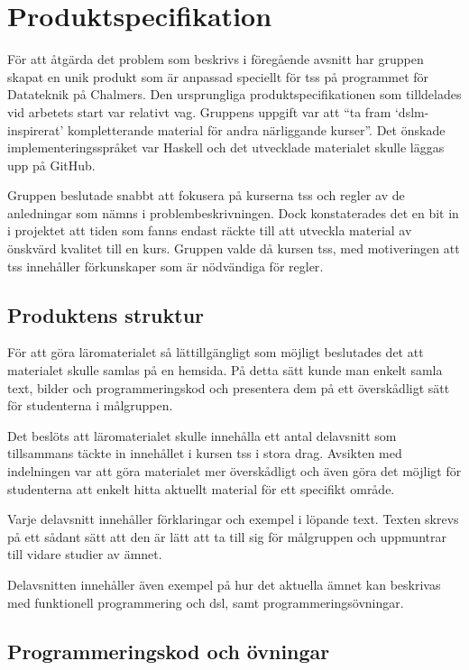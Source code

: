 \documentclass[12pt,a4paper,twoside,openright]{article}
\begin{document}
\newpage

\section{Produktspecifikation}
För att åtgärda det problem som beskrivs i föregående avsnitt har
gruppen skapat en unik produkt som är anpassad speciellt för \gls{tss}
på programmet för Datateknik på Chalmers. Den ursprungliga
produktspecifikationen som tilldelades vid arbetets start var relativt
vag. Gruppens uppgift var att ``ta fram `\gls{dslm}-inspirerat'
kompletterande material för andra närliggande kurser''. Det önskade
implementerings\-språket var Haskell och det utvecklade materialet
skulle läggas upp på GitHub.

Gruppen beslutade snabbt att fokusera på kurserna \gls{tss} och
\gls{regler} av de anledningar som nämns i problembeskrivningen. Dock
konstaterades det en bit in i projektet att tiden som fanns endast
räckte till att utveckla material av önskvärd kvalitet till en
kurs. Gruppen valde då kursen \gls{tss}, med motiveringen att
\gls{tss} innehåller förkunskaper som är nödvändiga för \gls{regler}.

\subsection{Produktens struktur}
\label{sec:prodSpec}
För att göra läromaterialet så lättillgängligt som möjligt beslutades
det
att materialet skulle samlas på en hemsida. På detta sätt kunde man
enkelt samla text, bilder och programmeringskod och presentera dem på
ett överskådligt sätt för studenterna i målgruppen.

Det beslöts att läromaterialet skulle innehålla ett antal delavsnitt
som tillsammans täckte in innehållet i kursen \gls{tss} i stora drag.
Avsikten med indelningen var att göra materialet mer överskådligt och
även göra det möjligt för studenterna att enkelt hitta aktuellt
material för ett specifikt område.

Varje delavsnitt innehåller förklaringar och exempel i löpande
text. Texten skrevs på ett sådant sätt att den är lätt att ta till sig
för målgruppen och uppmuntrar till vidare studier av ämnet.

Delavsnitten innehåller även exempel på hur det aktuella ämnet kan
beskrivas med funktionell programmering och \gls{dsl}, samt
programmeringsövningar.

\subsection{Programmeringskod och övningar}
\end{document}
